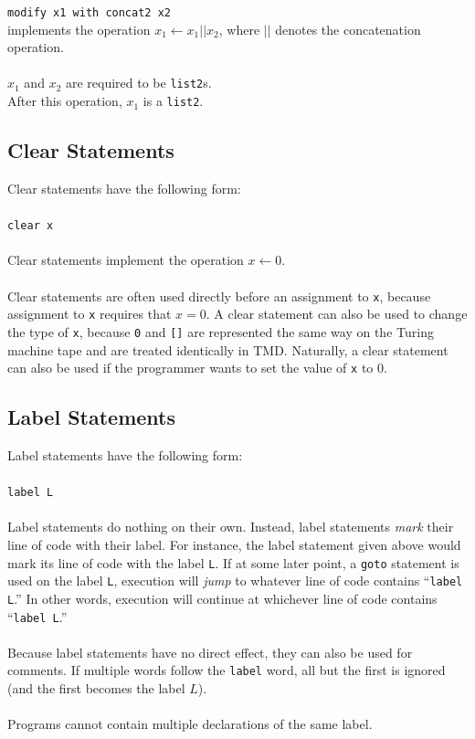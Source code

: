 \documentclass[11pt]{report}
\begin{document}
\texttt{modify x1 with concat2 x2} \\
implements the operation $x_1 \leftarrow x_1 || x_2$, where $||$ denotes the concatenation operation. \\ \\
$x_1$ and $x_2$ are required to be \texttt{list2}s. \\
After this operation, $x_1$ is a \texttt{list2}.

\subsection{Clear Statements}

Clear statements have the following form: \\ \\
\texttt{clear x} \\ \\ 
Clear statements implement the operation $x \leftarrow 0$. \\ \\
Clear statements are often used directly before an assignment to \texttt{x}, because assignment to \texttt{x} requires that $x = 0$. A clear statement can also be used to change the type of \texttt{x}, because \texttt{0} and \texttt{[]} are represented the same way on the Turing machine tape and are treated identically in TMD. Naturally, a clear statement can also be used if the programmer wants to set the value of \texttt{x} to 0. \\

\subsection{Label Statements}

Label statements have the following form: \\ \\ 
\texttt{label L} \\ \\
Label statements do nothing on their own. Instead, label statements \emph{mark} their line of code with their label. For instance, the label statement given above would mark its line of code with the label \texttt{L}. If at some later point, a \texttt{goto} statement is used on the label \texttt{L}, execution will \emph{jump} to whatever line of code contains ``\texttt{label L}.'' In other words, execution will continue at whichever line of code contains ``\texttt{label L}.'' \\ \\
Because label statements have no direct effect, they can also be used for comments. If multiple words follow the \texttt{label} word, all but the first is ignored (and the first becomes the label $L$). \\ \\
Programs cannot contain multiple declarations of the same label.
\end{document}
